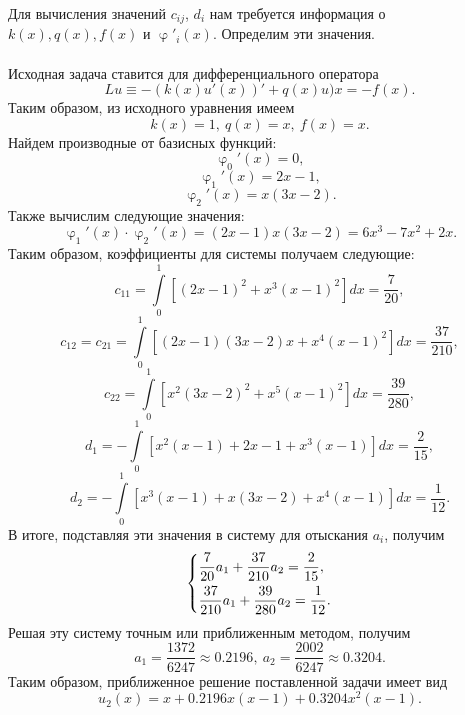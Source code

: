\documentclass[a4paper, 12pt]{article}
\renewcommand{\varphi}{\upvarphi}
\begin{document}
	Для вычисления значений $c_{ij}$, $d_i$ нам требуется информация о $k(x), q(x), f(x)$ и $\varphi'_i(x)$. Определим эти значения.\\\\
	Исходная задача ставится для дифференциального оператора 
	$$Lu \equiv -(k(x) u'(x))' + q(x)u)x = -f(x).$$
	Таким образом, из исходного уравнения имеем 
	$$k(x) = 1,\ q(x) = x,\ f(x) = x.$$
	Найдем производные от базисных функций:
	$$\varphi_0'(x) = 0,$$
	$$\varphi_1'(x) = 2x - 1,$$
	$$\varphi_2'(x) = x(3x - 2).$$
	Также вычислим следующие значения:
	$$\varphi_1'(x)\cdot \varphi_2'(x) = (2x-1)x(3x-2) = 6x^3 - 7x^2 + 2x.$$
	Таким образом, коэффициенты для системы получаем следующие:
	$$c_{11} = \int\limits_0^1 \left[(2x-1)^2 + x^3 (x-1)^2\right]dx = \dfrac{7}{20},$$
	$$c_{12} = c_{21} = \int\limits_0^1 \left[(2x-1)(3x-2)x + x^4 (x-1)^2\right]dx =\dfrac{37}{210},$$
	$$c_{22} = \int\limits_0^1 \left[x^2(3x-2)^2 + x^5 (x-1)^2\right]dx = \dfrac{39}{280},$$
	$$d_1 = -\int\limits_0^1 \left[x^2(x-1) + 2x-1+ x^3(x-1)\right]dx = \dfrac{2}{15},$$
	$$d_2 = -\int\limits_0^1 \left[x^3(x-1) + x(3x-2)+ x^4(x-1)\right]dx = \dfrac{1}{12}.$$
	В итоге, подставляя эти значения в систему для отыскания $a_i$, получим
	$$\begin{dcases}
		\dfrac{7}{20} a_1 + \dfrac{37}{210} a_2 = \dfrac{2}{15},\\
		\dfrac{37}{210} a_1 + \dfrac{39}{280} a_2 = \dfrac{1}{12}.
	\end{dcases}$$
	Решая эту систему точным или приближенным методом, получим 
	$$a_1 = \dfrac{1372}{6247}\approx 0.2196,\ a_2 = \dfrac{2002}{6247} \approx 0.3204.$$
	Таким образом, приближенное решение поставленной задачи имеет вид
	$$u_2(x) = x + 0.2196 x(x-1) + 0.3204 x^2(x-1).$$
\end{document}
